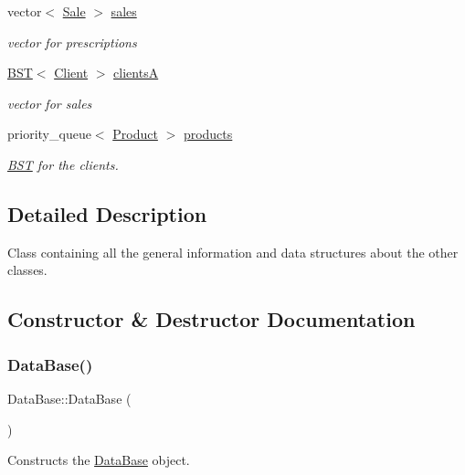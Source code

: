 \begin{DoxyCompactItemize}
vector$<$ \hyperlink{classSale}{Sale} $>$ \hyperlink{classDataBase_a4e48e9c0e840c7f9febf3344c5a003ba}{sales}
\begin{DoxyCompactList}\small\item\em vector for prescriptions \end{DoxyCompactList}\item 
\hyperlink{classBST}{B\+ST}$<$ \hyperlink{classClient}{Client} $>$ \hyperlink{classDataBase_a9b3973c4282ee24f7769f4f735b4b898}{clientsA}
\begin{DoxyCompactList}\small\item\em vector for sales \end{DoxyCompactList}\item 
priority\+\_\+queue$<$ \hyperlink{classProduct}{Product} $>$ \hyperlink{classDataBase_a83dd84eb12b869e3e585fe965c414eef}{products}
\begin{DoxyCompactList}\small\item\em \hyperlink{classBST}{B\+ST} for the clients. \end{DoxyCompactList}\end{DoxyCompactItemize}


\subsection{Detailed Description}
Class containing all the general information and data structures about the other classes. 

\subsection{Constructor \& Destructor Documentation}
\mbox{\label{classDataBase_a9fbd4936704ce4de391f92e92a072074}} 
\subsubsection{\texorpdfstring{Data\+Base()}{DataBase()}\hspace{0.1cm}{\footnotesize\ttfamily [1/3]}}
{\footnotesize\ttfamily Data\+Base\+::\+Data\+Base (\begin{DoxyParamCaption}{ }\end{DoxyParamCaption})}



Constructs the \hyperlink{classDataBase}{Data\+Base} object. 


